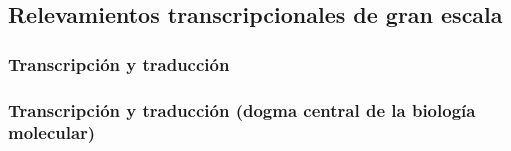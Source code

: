 \documentclass[serif,9pt, t]{beamer}
\begin{document}
\subsection{Relevamientos transcripcionales de gran escala}

\subsubsection*{Transcripción y traducción}
\begin{frame}
\frametitle{Transcripción y traducción (dogma central de la biología molecular)}

\begin{figure}[t]
  \centering
\end{figure}

\end{frame}
\end{document}

